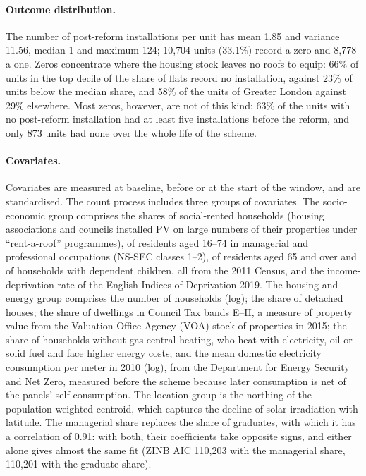 \paragraph{Outcome distribution.}
The number of post-reform installations per unit has mean 1.85 and variance 11.56, median 1 and maximum 124; 10{,}704 units (33.1\%) record a zero and 8{,}778 a one.
Zeros concentrate where the housing stock leaves no roofs to equip: 66\% of units in the top decile of the share of flats record no installation, against 23\% of units below the median share, and 58\% of the units of Greater London against 29\% elsewhere.
Most zeros, however, are not of this kind: 63\% of the units with no post-reform installation had at least five installations before the reform, and only 873 units had none over the whole life of the scheme.

\paragraph{Covariates.}
Covariates are measured at baseline, before or at the start of the window, and are standardised.
The count process includes three groups of covariates.
The socio-economic group comprises
the shares of social-rented households (housing associations and councils installed PV on large numbers of their properties under ``rent-a-roof'' programmes), of residents aged 16--74 in managerial and professional occupations (NS-SEC classes 1--2), of residents aged 65 and over and of households with dependent children, all from the 2011 Census, and the income-deprivation rate of the English Indices of Deprivation 2019.
The housing and energy group comprises
the number of households (log);
the share of detached houses;
the share of dwellings in Council Tax bands E--H, a measure of property value from the Valuation Office Agency (VOA) stock of properties in 2015;
the share of households without gas central heating, who heat with electricity, oil or solid fuel and face higher energy costs;
and the mean domestic electricity consumption per meter in 2010 (log), from the Department for Energy Security and Net Zero, measured before the scheme because later consumption is net of the panels' self-consumption.
The location group is the northing of the population-weighted centroid, which captures the decline of solar irradiation with latitude.
The managerial share replaces the share of graduates, with which it has a correlation of 0.91: with both, their coefficients take opposite signs, and either alone gives almost the same fit (ZINB AIC 110{,}203 with the managerial share, 110{,}201 with the graduate share).

